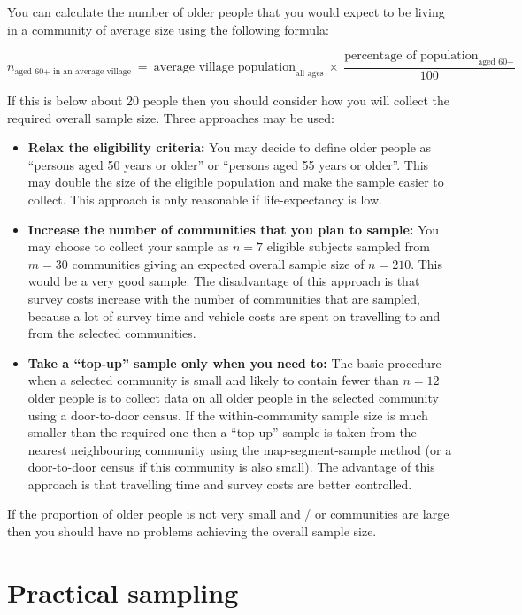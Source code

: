 \documentclass[12pt,a4paper]{book}
\theoremstyle{definition}
\theoremstyle{definition}
\theoremstyle{definition}
\theoremstyle{remark}
\begin{document}
You can calculate the number of older people that you would expect to be
living in a community of average size using the following formula:

\[ n_{\text{aged 60+ in an average village}} ~ = ~ \text{average village population}_{\text{all ages}} ~ \times ~ \frac{\text{percentage of population}_{\text{aged 60+}}}{100} \]

If this is below about 20 people then you should consider how you will
collect the required overall sample size. Three approaches may be used:

\begin{itemize}
\item
  \textbf{Relax the eligibility criteria:} You may decide to define
  older people as ``persons aged 50 years or older'' or ``persons aged
  55 years or older''. This may double the size of the eligible
  population and make the sample easier to collect. This approach is
  only reasonable if life-expectancy is low.
\item
  \textbf{Increase the number of communities that you plan to sample:}
  You may choose to collect your sample as \(n = 7\) eligible subjects
  sampled from \(m = 30\) communities giving an expected overall sample
  size of \(n = 210\). This would be a very good sample. The
  disadvantage of this approach is that survey costs increase with the
  number of communities that are sampled, because a lot of survey time
  and vehicle costs are spent on travelling to and from the selected
  communities.
\item
  \textbf{Take a ``top-up'' sample only when you need to:} The basic
  procedure when a selected community is small and likely to contain
  fewer than \(n = 12\) older people is to collect data on all older
  people in the selected community using a door-to-door census. If the
  within-community sample size is much smaller than the required one
  then a ``top-up'' sample is taken from the nearest neighbouring
  community using the map-segment-sample method (or a door-to-door
  census if this community is also small). The advantage of this
  approach is that travelling time and survey costs are better
  controlled.
\end{itemize}

If the proportion of older people is not very small and / or communities
are large then you should have no problems achieving the overall sample
size.

\hypertarget{practical-sampling}{%
\section{Practical sampling}\label{practical-sampling}}
\end{document}
